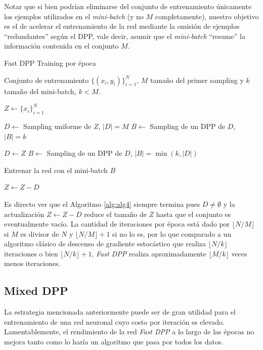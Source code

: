 \vspace{0.2cm}

Notar que si bien podrían eliminarse del conjunto de entrenamiento únicamente los ejemplos utilizados en el \textit{mini-batch} (y no $M$ completamente), nuestro objetivo es el de acelerar el entrenamiento de la red mediante la omisión de ejemplos ``redundantes'' según el DPP, vale decir, asumir que el \textit{mini-batch} ``resume'' la información contenida en el conjunto $M$.

\begin{algorithm}
\caption{Fast DPP Training por época} \label{alg:alg4}
\begin{algorithmic}
\Require Conjunto de entrenamiento $\{ (x_i,y_i) \}_{i=1}^N$, $M$ tamaño del primer sampling y $k$ tamaño del mini-batch, $k < M$.  

\State $Z \gets \{x_i\}_{i=1}^N$


\State $D \gets$ Sampling uniforme de $Z$, $|D| = M$
\State $B \gets$ Sampling de un DPP de $D$, $|B| = k$ 

\Else

\State $D \gets Z$
\State $B \gets$ Sampling de un DPP de $D$, $|B| = \min(k, |D|)$ 

\EndIf

\State Entrenar la red con el mini-batch $B$

\State $Z \gets Z - D$

\EndWhile   
\end{algorithmic}
\end{algorithm}

Es directo ver que el Algoritmo \ref{alg:alg4} siempre termina pues $D \neq \emptyset$ y la actualización $Z \gets Z - D$ reduce el tamaño de $Z$ hasta que el conjunto es eventualmente vacío. La cantidad de iteraciones por época está dado por $\lfloor N / M \rfloor$ si $M$ es divisor de $N$ y $\lfloor N / M \rfloor + 1$ si no lo es, por lo que comparado a un algoritmo clásico de descenso de gradiente estocástico que realiza $\lfloor N / k \rfloor$ iteraciones o bien $\lfloor N / k \rfloor + 1$, \textit{Fast DPP} realiza aproximadamente $\lfloor M / k \rfloor$ veces menos iteraciones.


\subsection{Mixed DPP}\label{section:mixed_dpp}

La estrategia mencionada anteriormente puede ser de gran utilidad para el entrenamiento de una red neuronal cuyo costo por iteración es elevado. Lamentablemente, el rendimiento de la red \textit{Fast DPP} a lo largo de las épocas no mejora tanto como lo haría un algoritmo que pasa por todos los datos.

